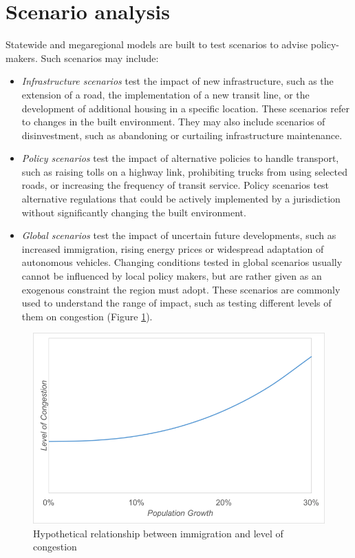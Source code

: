 \section{Scenario analysis}\label{sec:scenario-analysis}

Statewide and megaregional models are built to test scenarios to advise policy-makers. Such scenarios may include:

\begin{itemize}
\item
\emph{Infrastructure scenarios} test the impact of new infrastructure, such as the extension of a road, the implementation of a new transit line, or the development of additional housing in a specific location. These scenarios refer to changes in the built environment. They may also include scenarios of disinvestment, such as abandoning or curtailing infrastructure maintenance.
\item
\emph{Policy scenarios} test the impact of alternative policies to handle transport, such as raising tolls on a highway link, prohibiting trucks from using selected roads, or increasing the frequency of transit service. Policy scenarios test alternative regulations that could be actively implemented by a jurisdiction without significantly changing the built environment.
\item
\emph{Global scenarios} test the impact of uncertain future developments, such as increased immigration, rising energy prices or widespread adaptation of autonomous vehicles. Changing conditions tested in global scenarios usually cannot be influenced by local policy makers, but are rather given as an exogenous constraint the region must adopt. These scenarios are commonly used to understand the range of impact, such as testing different levels of them on congestion (Figure \ref{fig:immigration-vs-congestion}).
\end{itemize}

\begin{figure}
\centering
\includegraphics[scale=0.4]{graphics/03-immigration-vs-congestion}
\caption{Hypothetical relationship between immigration and level of congestion}
\label{fig:immigration-vs-congestion}
\end{figure}

